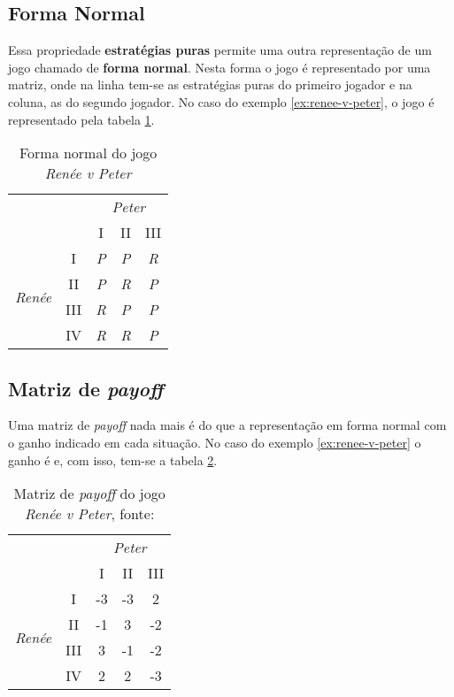 \subsection{Forma Normal}
\label{subsec:forma-normal}

Essa propriedade \textbf{estratégias puras} permite uma outra representação de um jogo chamado de \textbf{forma normal}. Nesta forma o jogo é representado por uma matriz, onde na linha tem-se as estratégias puras do primeiro jogador e na coluna, as do segundo jogador. No caso do exemplo \ref{ex:renee-v-peter}, o jogo é representado pela tabela \ref{tab:forma-normal-do-jogo-renee-v-peter}.

\begin{table}[ht]
\centering
\begin{tabular}{cc|ccc}
\hline
 &  & \multicolumn{3}{c}{\emph{Peter}}\tabularnewline
 &  & I & II & III\tabularnewline
\hline
\multirow{4}{*}{\begin{turn}{90}
\emph{Renée}
\end{turn}} & I & \emph{P} & \emph{P} & \emph{R}\tabularnewline
 & II & \emph{P} & \emph{R} & \emph{P}\tabularnewline
 & III & \emph{R} & \emph{P} & \emph{P}\tabularnewline
 & IV & \emph{R} & \emph{R} & \emph{P}\tabularnewline
\hline
\end{tabular}
\caption{Forma normal do jogo \emph{Renée v Peter}}
\label{tab:forma-normal-do-jogo-renee-v-peter}
\end{table}

\subsection{Matriz de \emph{payoff}}
\label{subsec:matriz-de-payoff}

Uma matriz de \emph{payoff} nada mais é do que a representação em forma normal com o ganho indicado em cada situação. No caso do exemplo \ref{ex:renee-v-peter} o ganho é e, com isso, tem-se a tabela \ref{tab:matriz-de-payoff-do-jogo-renee-v-peter}.

\begin{table}[ht]
\centering
\begin{tabular}{cc|ccc}
\hline
 &  & \multicolumn{3}{c}{\emph{Peter}}\tabularnewline
 &  & I & II & III\tabularnewline
\hline
\multirow{4}{*}{\begin{turn}{90}
\emph{Renée}
\end{turn}} & I & -3 & -3 & 2\tabularnewline
 & II & -1 & 3 & -2\tabularnewline
 & III & 3 & -1 & -2\tabularnewline
 & IV & 2 & 2 & -3\tabularnewline
\hline
\end{tabular}
\caption{Matriz de \emph{payoff} do jogo \emph{Renée v Peter}, fonte: \cite{spaniel_2011}}
\label{tab:matriz-de-payoff-do-jogo-renee-v-peter}
\end{table}

